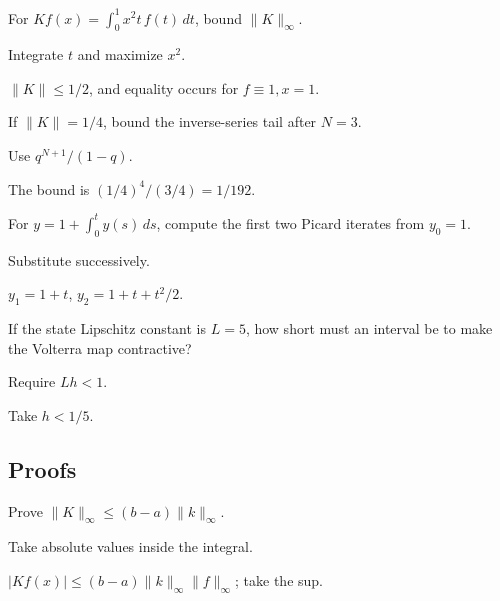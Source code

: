 \begin{exercise}\label{exr:ii18-expand-02}
For \(Kf(x)=\int_0^1 x^2t\,f(t)\,dt\), bound \(\|K\|_\infty\).
\end{exercise}
\begin{hint}
Integrate \(t\) and maximize \(x^2\).
\end{hint}
\begin{solution}
\(\|K\|\le1/2\), and equality occurs for \(f\equiv1,x=1\).
\end{solution}

\begin{exercise}\label{exr:ii18-expand-03}
If \(\|K\|=1/4\), bound the inverse-series tail after \(N=3\).
\end{exercise}
\begin{hint}
Use \(q^{N+1}/(1-q)\).
\end{hint}
\begin{solution}
The bound is \((1/4)^4/(3/4)=1/192\).
\end{solution}

\begin{exercise}\label{exr:ii18-expand-04}
For \(y=1+\int_0^t y(s)\,ds\), compute the first two Picard iterates from \(y_0=1\).
\end{exercise}
\begin{hint}
Substitute successively.
\end{hint}
\begin{solution}
\(y_1=1+t\), \(y_2=1+t+t^2/2\).
\end{solution}

\begin{exercise}\label{exr:ii18-expand-05}
If the state Lipschitz constant is \(L=5\), how short must an interval be to make the Volterra map contractive?
\end{exercise}
\begin{hint}
Require \(Lh<1\).
\end{hint}
\begin{solution}
Take \(h<1/5\).
\end{solution}

\subsection*{Proofs}

\begin{exercise}\label{exr:ii18-expand-06}
Prove \(\|K\|_\infty\le(b-a)\|k\|_\infty\).
\end{exercise}
\begin{hint}
Take absolute values inside the integral.
\end{hint}
\begin{solution}
\(|Kf(x)|\le(b-a)\|k\|_\infty\|f\|_\infty\); take the sup.
\end{solution}

